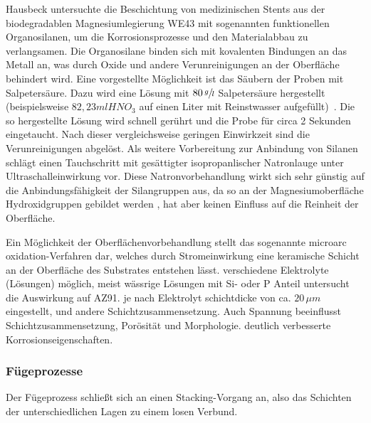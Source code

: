 Hausbeck \cite{Hausbeck.2012} untersuchte die Beschichtung von medizinischen Stents aus der biodegradablen Magnesiumlegierung WE43 mit sogenannten funktionellen Organosilanen, um die Korrosionsprozesse und den Materialabbau zu verlangsamen.
Die Organosilane binden sich mit kovalenten Bindungen an das Metall an, was durch Oxide und andere Verunreinigungen an der Oberfläche behindert wird.
Eine vorgestellte Möglichkeit ist das Säubern der Proben mit Salpetersäure.
Dazu wird eine Lösung mit $80\, \sfrac{g}{l}$ Salpetersäure hergestellt (beispielsweise $82,23 ml HNO_3$ auf einen Liter mit Reinstwasser aufgefüllt)~.
Die so hergestellte Lösung wird schnell gerührt und die Probe für circa 2 Sekunden eingetaucht.
Nach dieser vergleichsweise geringen Einwirkzeit sind die Verunreinigungen abgelöst.
Als weitere Vorbereitung zur Anbindung von Silanen schlägt \cite{Hausbeck.2012} einen Tauchschritt mit gesättigter isopropanlischer Natronlauge unter Ultraschalleinwirkung vor.
Diese Natronvorbehandlung wirkt sich sehr günstig auf die Anbindungsfähigkeit der Silangruppen aus, da so an der Magnesiumoberfläche Hydroxidgruppen gebildet werden \cite{Hausbeck.2012,Gou.2004}, hat aber keinen Einfluss auf die Reinheit der Oberfläche.

Ein Möglichkeit der Oberflächenvorbehandlung stellt das sogenannte microarc oxidation-Verfahren dar, welches durch Stromeinwirkung eine keramische Schicht an der Oberfläche des Substrates entstehen lässt. 
verschiedene Elektrolyte (Lösungen) möglich, meist wässrige Lösungen mit Si- oder P Anteil
\cite{Cai.2006} untersucht die Auswirkung auf AZ91. je nach Elektrolyt schichtdicke von ca. $20 \, \mu m$ eingestellt, und andere Schichtzusammensetzung.
Auch Spannung beeinflusst Schichtzusammensetzung, Porösität und Morphologie.
deutlich verbesserte Korrosionseigenschaften.



\subsubsection{Fügeprozesse}

Der Fügeprozess schließt sich an einen Stacking-Vorgang an, also das Schichten der unterschiedlichen Lagen zu einem losen Verbund. 

